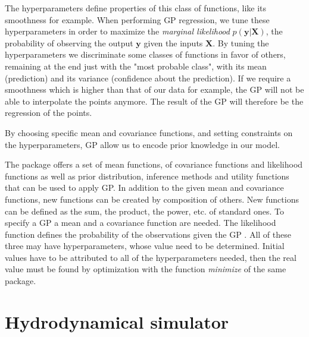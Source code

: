 \noindent The hyperparameters define properties of this class of functions, like its smoothness for example.
When performing GP regression, we tune these hyperparameters in order to maximize the \emph{marginal likelihood} $p(\bm{y}\vert \bm{X})$, the probability of observing the output $\bm{y}$ given the inputs $\bm{X}$.
By tuning the hyperparameters we  discriminate some classes of functions in favor of others, remaining at the end just with the "most probable class", with its mean (prediction) and its variance (confidence about the prediction).
If we require a smoothness which is higher than that of our data for example, the GP will not be able to interpolate the points anymore.
The result of the GP will therefore be the regression of the points.

By choosing specific mean and covariance functions, and setting constraints on the hyperparameters, GP allow us to encode prior knowledge in our model.


  




The package offers a set of mean functions, of covariance functions and likelihood functions as well as prior distribution, inference methods and utility functions that can be used to apply GP.
In addition to the given mean and covariance functions, new functions can be created by composition of others.
New functions can be defined as the sum, the product, the power, etc. of standard ones.
To specify a GP a mean and a covariance function are needed.
The likelihood function defines the probability of the observations given the GP \autocite{rasmussen_gaussian_2010}.
All of these three may have hyperparameters, whose value need to be determined.
Initial values have to be attributed to all of the hyperparameters needed, then the real value must be found by optimization with the function \emph{minimize} of the same package.









\section{Hydrodynamical simulator}\label{sec:simulator}

